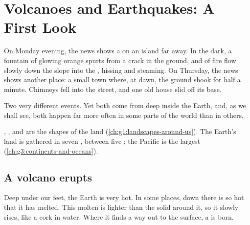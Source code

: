 \chapter{Volcanoes and Earthquakes: A First Look}\label{ch:g4:volcanoes-earthquakes-first-look}

On Monday evening, the news shows a  on an island far away. In the
dark, a fountain of glowing orange  spurts from a crack in the ground,
and  of fire flow slowly down the slope into the , hissing and
steaming. On Thursday, the news shows another place: a small town where,
at dawn, the ground shook for half a minute. Chimneys fell into the street,
and one old house slid off its base.

Two very different events. Yet both come from deep inside the Earth, and,
as we shall see, both happen far more often in some parts of the world than
in others.

\begin{recall}
, ,  and  are the shapes of the land
(\cref{ch:g1:landscapes-around-us}). The Earth's land is gathered in seven
, between five ; the Pacific is the largest 
(\cref{ch:g3:continents-and-oceans}).
\end{recall}

\section{A volcano erupts}

Deep under our feet, the Earth is very hot. In some places,  down there
is so hot that it has melted. This molten  is lighter than the solid
 around it, so it slowly rises, like a cork in water. Where it finds a
way out to the surface, a  is born.

